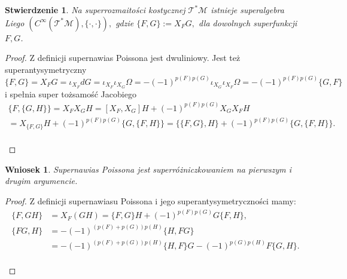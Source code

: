 \documentclass[11pt,a4paper]{report}
\newtheorem{corollary}[theorem]{Wniosek}
\newtheorem{proposition}[theorem]{Stwierdzenie}
\theoremstyle{definition}
\begin{document}
\begin{proposition}
	Na superrozmaitości kostycznej $\mathcal{T^*M}$ istnieje superalgebra Liego $(C^\infty (\mathcal{T^*M}), \{\cdot , \cdot \}),$ gdzie $\{ F, G \} := X_F G,$ dla dowolnych superfunkcji $F,G$.
\end{proposition}
			      				
\begin{proof}
	Z definicji supernawias Poissona jest dwuliniowy. Jest też superantysymetryczny
	\begin{equation*}
		\{ F,G \} = X_F G = \iota_{X_F} dG = \iota_{X_F} \iota_{X_G} \Omega = -(-1)^{p(F)p(G)} \iota_{X_G} \iota_{X_F} \Omega = -(-1)^{p(F)p(G)} \{ G, F \}
	\end{equation*}
	i spełnia super tożsamość Jacobiego
	\begin{equation*}
		\begin{gathered}
			\{F, \{G, H \} \} = X_F X_G H = [X_F, X_G] H + (-1)^{p(F)p(G)} X_G X_F H \\ 
			= X_{\{F,G\}} H + (-1)^{p(F)p(G)} \{G, \{F, H \} \}
			= \{ \{F, G\}, H \} + (-1)^{p(F)p(G)} \{G, \{F, H \} \}.
		\end{gathered}
	\end{equation*} \\[-29.5pt]
\end{proof}
			      				
\begin{corollary}
	Supernawias Poissona jest superróżniczkowaniem na pierwszym i drugim argumencie.
\end{corollary}
			      				 
\begin{proof}
	Z definicji supernawiasu Poissona i jego superantysymetryczności mamy:
	\begin{equation*}
		\begin{aligned}
			\{ F, GH \} & = X_F (GH) = \{F,G\} H + (-1)^{p(F)p(G)} G \{ F,H\},           \\
			\{ FG, H \} & = - (-1)^{(p(F)+p(G))p(H)} \{ H, FG \}                         \\ 
			            & = -(-1)^{(p(F) + p(G))p(H)}\{H,F\}G -(-1)^{p(G)p(H)} F\{G,H\}. 
		\end{aligned}
	\end{equation*}\\[-27pt]
\end{proof}
			      				
\end{document}
